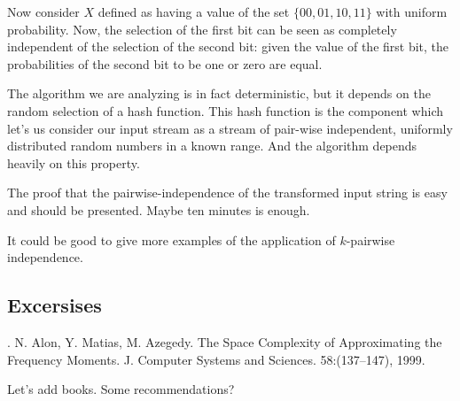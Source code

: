 \documentclass[12pt]{article}
\begin{document}
Now consider $X$ defined as having a value of the set $\{00,01,10,11\}$ with uniform probability. Now, the selection of the first bit can be seen as completely independent of the selection of the second bit: given the value of the first bit, the probabilities  of the second bit to be one or zero are equal.

The algorithm we are analyzing is in fact deterministic, but it depends on the random selection of a hash function. This hash function is the component which let's us consider our input stream as a stream of pair-wise independent, uniformly distributed random numbers in a known range. And the algorithm depends heavily on this property.

The proof that the pairwise-independence of the transformed input string is easy and should be presented. Maybe ten minutes is enough.
 
It could be good to give more examples of the application of $k$-pairwise independence.


\subsection{Excersises}



\begin{thebibliography}{XXX}

 . N. Alon, Y. Matias, M. Azegedy. The Space Complexity of Approximating the Frequency Moments. J. Computer Systems and Sciences. 58:(137--147), 1999.

Let's add books. Some recommendations?

\end{thebibliography}
\end{document}
